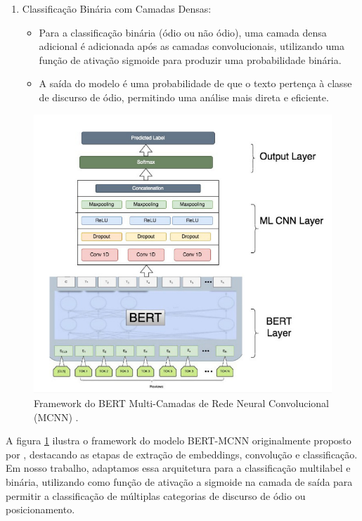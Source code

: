 \documentclass[sigconf,nonacm]{acmart}
\begin{document}
\begin{enumerate}
  \item Classificação Binária com Camadas Densas:
  \begin{itemize}
    \item Para a classificação binária (ódio ou não ódio), uma camada densa adicional é adicionada após as camadas convolucionais, utilizando uma função de ativação sigmoide para produzir uma probabilidade binária.
    \item A saída do modelo é uma probabilidade de que o texto pertença à classe de discurso de ódio, permitindo uma análise mais direta e eficiente.
  \end{itemize}
\end{enumerate}

\begin{figure}[H]
  \centering
  \includegraphics[width=\linewidth]{./resources/framework.png}
  \caption{Framework do BERT Multi-Camadas de Rede Neural Convolucional (MCNN) \cite{ATANDOH2023101578}.}
  \label{fig:framework}
\end{figure}

A figura \ref{fig:framework} ilustra o framework do modelo BERT-MCNN originalmente proposto por \cite{ATANDOH2023101578}, destacando as etapas de extração de embeddings, convolução e classificação.
Em nosso trabalho, adaptamos essa arquitetura para a classificação multilabel e binária, utilizando como função de ativação a sigmoide na camada de saída para permitir a classificação de múltiplas categorias de discurso de ódio ou posicionamento.
\end{document}
